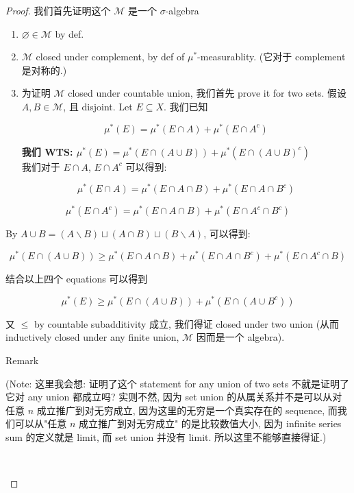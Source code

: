 \begin{proof}

我们首先证明这个 \(\mathcal{M}\) 是一个 \(\sigma\)-algebra

\begin{enumerate}
\item
  \(\varnothing \in \mathcal{M}\) by def.
\item
  \(\mathcal{M}\) closed under complement, by def of \(\mu^{\ast}\)-measurablity. (它对于 complement 是对称的.)
\item
  为证明 \(\mathcal{M}\) closed under countable union, 我们首先 prove it for two sets. 假设 \(A,B \in \mathcal{M}\), 且 disjoint. Let \(E \subseteq X\). 我们已知

  \[\mu^{\ast}(E) = \mu^{\ast}(E \cap A) + \mu^{\ast}(E \cap A^{c})\]

  \textbf{我们 WTS: \(\mu^{\ast}(E) = \mu^{\ast}(E \cap (A \cup B)) + \mu^{\ast}(E \cap (A \cup B)^{c})\)}\\
  我们对于 \(E \cap A\), \(E \cap A^{c}\) 可以得到:

  \[\mu^{\ast}(E \cap A) = \mu^{\ast}(E \cap A \cap B) + \mu^{\ast}(E \cap A \cap B^{c})\]
\end{enumerate}

\[\mu^{\ast}(E \cap A^{c}) = \mu^{\ast}(E \cap A \cap B) + \mu^{\ast}(E \cap A^{c} \cap B^{c})\]

By \(A \cup B = (A\backslash B) \sqcup (A \cap B) \sqcup (B\backslash A)\), 可以得到:

\[\mu^{\ast}(E \cap (A \cup B)) \geq \mu^{\ast}(E \cap A \cap B) + \mu^{\ast}(E \cap A \cap B^{c}) + \mu^{\ast}(E \cap A^{c} \cap B)\]

结合以上四个 equations 可以得到

\[\mu^{\ast}(E) \geq \mu^{\ast}(E \cap (A \cup B)) + \mu^{\ast}(E \cap (A \cup B^{c}))\]

又 \(\leq\) by countable subadditivity 成立, 我们得证 closed under two union (从而 inductively closed under any finite union, \(\mathcal{M}\) 因而是一个 algebra).\\

\begin{qlremark}{Remark}

(Note: 这里我会想: 证明了这个 statement for any union of two sets 不就是证明了它对 any union 都成立吗? 实则不然, 因为 set union 的从属关系并不是可以从对任意 \(n\) 成立推广到对无穷成立, 因为这里的无穷是一个真实存在的 sequence, 而我们可以从"任意 \(n\) 成立推广到对无穷成立" 的是比较数值大小, 因为 infinite series sum 的定义就是 limit, 而 set union 并没有 limit. 所以这里不能够直接得证.)\\
\strut \\


\end{qlremark}
\end{proof}
